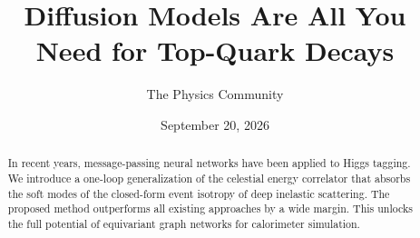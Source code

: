 \documentclass[11pt]{article}
\title{Diffusion Models Are All You Need for Top-Quark Decays}
\author{The Physics Community}
\date{September 20, 2026}
\begin{document}
\maketitle
\begin{abstract}
In recent years, message-passing neural networks have been applied to
Higgs tagging. We introduce a one-loop generalization of the celestial
energy correlator that absorbs the soft modes of the closed-form event
isotropy of deep inelastic scattering. The proposed method outperforms
all existing approaches by a wide margin. This unlocks the full
potential of equivariant graph networks for calorimeter simulation.
\end{abstract}
\tableofcontents





\nocite{*}


\end{document}
